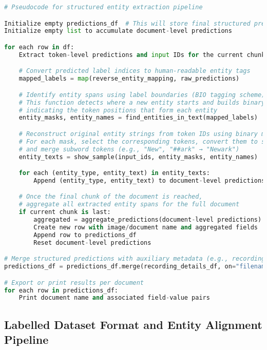 \documentclass{article}
\begin{document}
\begin{lstlisting}[caption={End-to-End Structured Entity Extraction Pipeline}, label={lst:end_to_end_pipeline}, language=Python, frame=single]
# Pseudocode for structured entity extraction pipeline

Initialize empty predictions_df  # This will store final structured predictions
Initialize empty list to accumulate document-level predictions

for each row in df:
    Extract token-level predictions and input IDs for the current chunk

    # Convert predicted label indices to human-readable entity tags
    mapped_labels = map(reverse_entity_mapping, raw_predictions)

    # Identify entity spans using label boundaries (BIO tagging scheme)
    # This function detects where a new entity starts and builds binary masks
    # indicating the token positions that form each entity
    entity_masks, entity_names = find_entities_in_text(mapped_labels)

    # Reconstruct original entity strings from token IDs using binary masks
    # For each mask, select the corresponding tokens, convert them to strings,
    # and merge subword tokens (e.g., "New", "##ark" → "Newark")
    entity_texts = show_sample(input_ids, entity_masks, entity_names)

    for each (entity_type, entity_text) in entity_texts:
        Append (entity_type, entity_text) to document-level predictions

    # Once the final chunk of the document is reached,
    # aggregate all extracted entity spans for the full document
    if current chunk is last:
        aggregated = aggregate_predictions(document-level predictions)
        Create new row with image/document name and aggregated fields
        Append row to predictions_df
        Reset document-level predictions

# Merge structured predictions with auxiliary metadata (e.g., recording details)
predictions_df = predictions_df.merge(recording_details_df, on="filename")

# Export or print results per document
for each row in predictions_df:
    Print document name and associated field-value pairs
\end{lstlisting}


\subsection{Labelled Dataset Format and Entity Alignment Pipeline}
\end{document}
